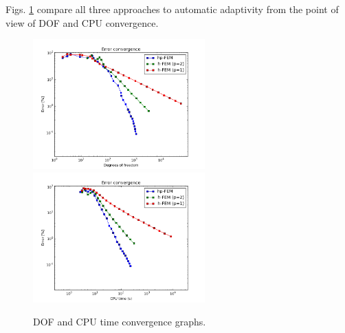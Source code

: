 Figs. \ref{fig:nist-8-conv} compare all
three approaches to automatic adaptivity from the point
of view of DOF and CPU convergence.

\begin{figure}[!ht]
\centering
\includegraphics[height=5cm]{nist/nist-8/conv_dof_aniso.png}\ \
\includegraphics[height=5cm]{nist/nist-8/conv_cpu_aniso.png}
\caption{DOF and CPU time convergence graphs.}
\label{fig:nist-8-conv}
\end{figure}

